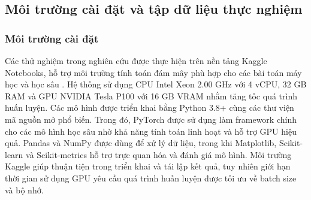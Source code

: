 \documentclass[10pt,twoside]{article}
\begin{document}
\subsection{Môi trường cài đặt và tập dữ liệu thực nghiệm}

\subsubsection{Môi trường cài đặt}
Các thử nghiệm trong nghiên cứu được thực hiện trên nền tảng Kaggle Notebooks, hỗ trợ môi trường tính toán đám mây phù hợp cho các bài toán máy học và học sâu \cite{noauthor_notebooks_nodate}. Hệ thống sử dụng CPU Intel Xeon 2.00 GHz với 4 vCPU, 32 GB RAM và GPU NVIDIA Tesla P100 với 16 GB VRAM nhằm tăng tốc quá trình huấn luyện. Các mô hình được triển khai bằng Python 3.8+ cùng các thư viện mã nguồn mở phổ biến. Trong đó, PyTorch được sử dụng làm framework chính cho các mô hình học sâu nhờ khả năng tính toán linh hoạt và hỗ trợ GPU hiệu quả. Pandas và NumPy được dùng để xử lý dữ liệu, trong khi Matplotlib, Scikit-learn và Scikit-metrics hỗ trợ trực quan hóa và đánh giá mô hình. Môi trường Kaggle giúp thuận tiện trong triển khai và tái lập kết quả, tuy nhiên giới hạn thời gian sử dụng GPU yêu cầu quá trình huấn luyện được tối ưu về batch size và bộ nhớ.
\end{document}
